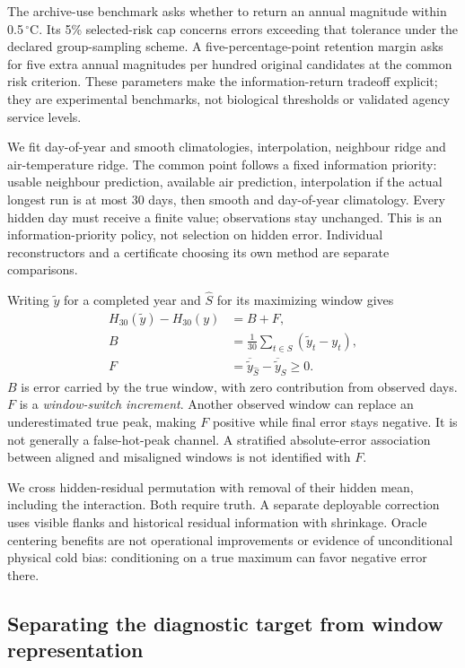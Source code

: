 The archive-use benchmark asks whether to return an annual magnitude within 0.5\,$^{\circ}$C. Its 5\% selected-risk cap concerns errors exceeding that tolerance under the declared group-sampling scheme. A five-percentage-point retention margin asks for five extra annual magnitudes per hundred original candidates at the common risk criterion. These parameters make the information-return tradeoff explicit; they are experimental benchmarks, not biological thresholds or validated agency service levels.

We fit day-of-year and smooth climatologies, interpolation, neighbour ridge and air-temperature ridge. The common point follows a fixed information priority: usable neighbour prediction, available air prediction, interpolation if the actual longest run is at most 30 days, then smooth and day-of-year climatology. Every hidden day must receive a finite value; observations stay unchanged. This is an information-priority policy, not selection on hidden error. Individual reconstructors and a certificate choosing its own method are separate comparisons.

Writing $\widetilde y$ for a completed year and $\widehat S$ for its maximizing window gives
\begin{align}
H_{30}(\widetilde y)-H_{30}(y)&=B+F,\\
B&=\frac{1}{30}\sum_{t\in S}(\widetilde y_t-y_t),\\
F&=\overline{\widetilde y}_{\widehat S}-\overline{\widetilde y}_{S}\geq0.
\end{align}
$B$ is error carried by the true window, with zero contribution from observed days. $F$ is a \emph{window-switch increment}. Another observed window can replace an underestimated true peak, making $F$ positive while final error stays negative. It is not generally a false-hot-peak channel. A stratified absolute-error association between aligned and misaligned windows is not identified with $F$.

We cross hidden-residual permutation with removal of their hidden mean, including the interaction. Both require truth. A separate deployable correction uses visible flanks and historical residual information with shrinkage. Oracle centering benefits are not operational improvements or evidence of unconditional physical cold bias: conditioning on a true maximum can favor negative error there.

\subsection{Separating the diagnostic target from window representation}


